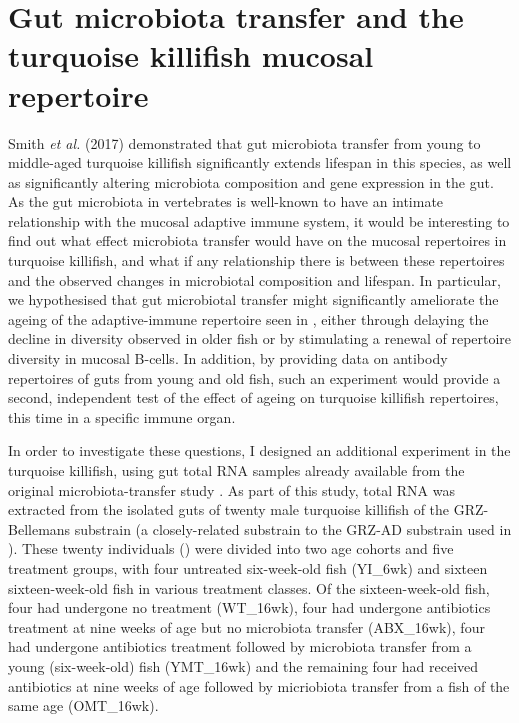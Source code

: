 \clearpage\newpage
\section{Gut microbiota transfer and the turquoise killifish mucosal repertoire}
\label{sec:igseq_gut}



Smith \textit{et al.} (2017) \parencite{smith2017microbiota} demonstrated that gut microbiota transfer from young to middle-aged turquoise killifish significantly extends lifespan in this species, as well as significantly altering microbiota composition and gene expression in the gut. As the gut microbiota in vertebrates is well-known to have an intimate relationship with the mucosal adaptive immune system, %
it would be interesting to find out what effect microbiota transfer would have on the mucosal repertoires in turquoise killifish, and what if any relationship there is between these repertoires and the observed changes in microbiotal composition and lifespan. In particular, we hypothesised that gut microbiotal transfer might significantly ameliorate the ageing of the adaptive-immune repertoire seen in , either through delaying the decline in diversity observed in older fish or by stimulating a renewal of repertoire diversity in mucosal B-cells. In addition, by providing data on antibody repertoires of guts from young and old fish, such an experiment would provide a second, independent test of the effect of ageing on turquoise killifish repertoires, this time in a specific immune organ.

In order to investigate these questions, I designed an additional \igseq experiment in the turquoise killifish, using gut total RNA samples already available from the original microbiota-transfer study \parencite{smith2017microbiota}. 
As part of this study, total RNA was extracted from the isolated guts of twenty male turquoise killifish of the GRZ-Bellemans substrain (a closely-related substrain to the GRZ-AD substrain used in ). These twenty individuals () were divided into two age cohorts and five treatment groups, with four untreated six-week-old fish (YI\_6wk) and sixteen sixteen-week-old fish in various treatment classes. Of the sixteen-week-old fish, four had undergone no treatment (WT\_16wk), four had undergone antibiotics treatment at nine weeks of age but no microbiota transfer (ABX\_16wk), four had undergone antibiotics treatment followed by microbiota transfer from a young (six-week-old) fish (YMT\_16wk) and the remaining four had received antibiotics at nine weeks of age followed by micriobiota transfer from a fish of the same age (OMT\_16wk).

